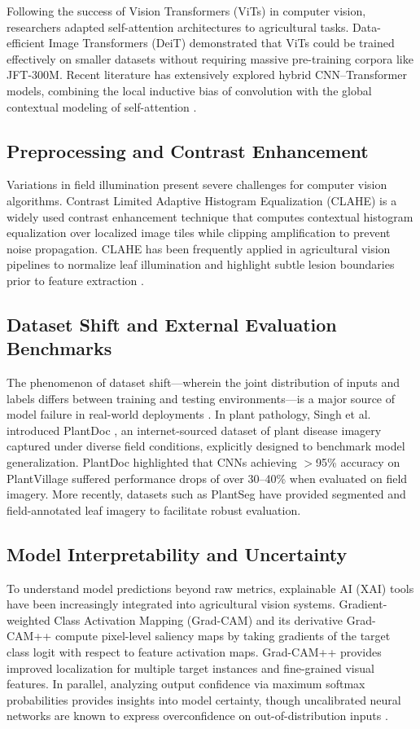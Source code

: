 \documentclass[10pt,journal,compsoc]{IEEEtran}
\begin{document}
Following the success of Vision Transformers (ViTs) \cite{dosovitskiy2021} in computer vision, researchers adapted self-attention architectures to agricultural tasks. Data-efficient Image Transformers (DeiT) \cite{touvron2021} demonstrated that ViTs could be trained effectively on smaller datasets without requiring massive pre-training corpora like JFT-300M. Recent literature has extensively explored hybrid CNN--Transformer models, combining the local inductive bias of convolution with the global contextual modeling of self-attention \cite{yuan2021, chu2021}.

\subsection{Preprocessing and Contrast Enhancement}
Variations in field illumination present severe challenges for computer vision algorithms. Contrast Limited Adaptive Histogram Equalization (CLAHE) \cite{zuiderveld1994} is a widely used contrast enhancement technique that computes contextual histogram equalization over localized image tiles while clipping amplification to prevent noise propagation. CLAHE has been frequently applied in agricultural vision pipelines to normalize leaf illumination and highlight subtle lesion boundaries prior to feature extraction \cite{militante2018}.

\subsection{Dataset Shift and External Evaluation Benchmarks}
The phenomenon of dataset shift---wherein the joint distribution of inputs and labels differs between training and testing environments---is a major source of model failure in real-world deployments \cite{candela2009}. In plant pathology, Singh et al. introduced PlantDoc \cite{singh2020}, an internet-sourced dataset of plant disease imagery captured under diverse field conditions, explicitly designed to benchmark model generalization. PlantDoc highlighted that CNNs achieving $>$95\% accuracy on PlantVillage suffered performance drops of over 30--40\% when evaluated on field imagery. More recently, datasets such as PlantSeg \cite{aitmagdalene2024} have provided segmented and field-annotated leaf imagery to facilitate robust evaluation.

\subsection{Model Interpretability and Uncertainty}
To understand model predictions beyond raw metrics, explainable AI (XAI) tools have been increasingly integrated into agricultural vision systems. Gradient-weighted Class Activation Mapping (Grad-CAM) and its derivative Grad-CAM++ \cite{chattopadhay2018} compute pixel-level saliency maps by taking gradients of the target class logit with respect to feature activation maps. Grad-CAM++ provides improved localization for multiple target instances and fine-grained visual features. In parallel, analyzing output confidence via maximum softmax probabilities provides insights into model certainty, though uncalibrated neural networks are known to express overconfidence on out-of-distribution inputs \cite{guo2017}.
\end{document}
